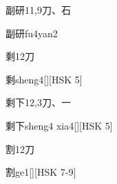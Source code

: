 \begin{Entry}{副研}{11,9}{⼑、⽯}
  \begin{Phonetics}{副研}{fu4yan2}
  \end{Phonetics}
\end{Entry}

\begin{Entry}{剩}{12}{⼑}
  \begin{Phonetics}{剩}{sheng4}[][HSK 5]
  \end{Phonetics}
\end{Entry}

\begin{Entry}{剩下}{12,3}{⼑、⼀}
  \begin{Phonetics}{剩下}{sheng4 xia4}[][HSK 5]
  \end{Phonetics}
\end{Entry}

\begin{Entry}{割}{12}{⼑}
  \begin{Phonetics}{割}{ge1}[][HSK 7-9]
  \end{Phonetics}
\end{Entry}


